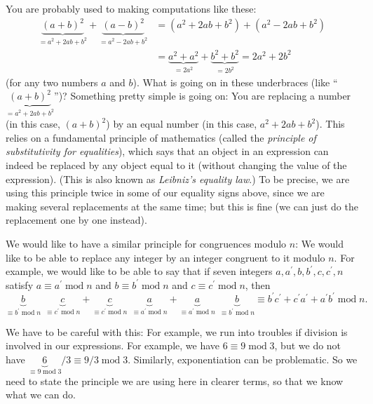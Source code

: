 \documentclass[numbers=enddot,12pt,final,onecolumn,notitlepage]{scrartcl}%
\numberwithin{exer}{subsection}
\theoremstyle{definition}
\begin{document}
You are probably used to making computations like these:%
\begin{align*}
\underbrace{\left(  a+b\right)  ^{2}}_{=a^{2}+2ab+b^{2}}+\underbrace{\left(
a-b\right)  ^{2}}_{=a^{2}-2ab+b^{2}}  &  =\left(  a^{2}+2ab+b^{2}\right)
+\left(  a^{2}-2ab+b^{2}\right) \\
&  =\underbrace{a^{2}+a^{2}}_{=2a^{2}}+\underbrace{b^{2}+b^{2}}_{=2b^{2}%
}=2a^{2}+2b^{2}%
\end{align*}
(for any two numbers $a$ and $b$). What is going on in these underbraces (like
\textquotedblleft$\underbrace{\left(  a+b\right)  ^{2}}_{=a^{2}+2ab+b^{2}}%
$\textquotedblright)? Something pretty simple is going on: You are replacing a
number (in this case, $\left(  a+b\right)  ^{2}$) by an equal number (in this
case, $a^{2}+2ab+b^{2}$). This relies on a fundamental principle of
mathematics (called the \textit{principle of substitutivity for equalities}),
which says that an object in an expression can indeed be replaced by any
object equal to it (without changing the value of the expression). (This is
also known as \textit{Leibniz's equality law}.) To be precise, we are using
this principle twice in some of our equality signs above, since we are making
several replacements at the same time; but this is fine (we can just do the
replacement one by one instead).

We would like to have a similar principle for congruences modulo $n$: We would
like to be able to replace any integer by an integer congruent to it modulo
$n$. For example, we would like to be able to say that if seven integers
$a,a^{\prime},b,b^{\prime},c,c^{\prime},n$ satisfy $a\equiv a^{\prime
}\operatorname{mod}n$ and $b\equiv b^{\prime}\operatorname{mod}n$ and $c\equiv
c^{\prime}\operatorname{mod}n$, then%
\[
\underbrace{b}_{\equiv b^{\prime}\operatorname{mod}n}\ \ \underbrace{c}%
_{\equiv c^{\prime}\operatorname{mod}n}+\underbrace{c}_{\equiv c^{\prime
}\operatorname{mod}n}\ \ \underbrace{a}_{\equiv a^{\prime}\operatorname{mod}%
n}+\underbrace{a}_{\equiv a^{\prime}\operatorname{mod}n}\ \ \underbrace{b}%
_{\equiv b^{\prime}\operatorname{mod}n}\equiv b^{\prime}c^{\prime}+c^{\prime
}a^{\prime}+a^{\prime}b^{\prime}\operatorname{mod}n.
\]


We have to be careful with this: For example, we run into troubles if division
is involved in our expressions. For example, we have $6\equiv
9\operatorname{mod}3$, but we do not have $\underbrace{6}_{\equiv
9\operatorname{mod}3}/3\equiv9/3\operatorname{mod}3$. Similarly,
exponentiation can be problematic. So we need to state the principle we are
using here in clearer terms, so that we know what we can do.
\end{document}
